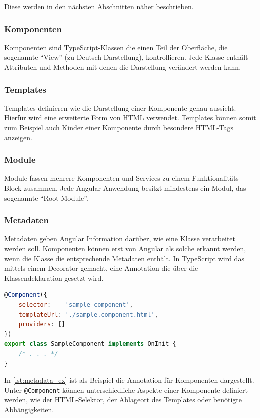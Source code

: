 Diese werden in den nächsten Abschnitten näher beschrieben.

\subsubsection{Komponenten}
Komponenten sind TypeScript-Klassen die einen Teil der Oberfläche, die sogenannte \enquote{View} (zu Deutsch Darstellung), kontrollieren. Jede Klasse enthält Attributen und Methoden mit denen die Darstellung verändert werden kann.

\subsubsection{Templates}
Templates definieren wie die Darstellung einer Komponente genau aussieht. Hierfür wird eine erweiterte Form von \acs{HTML} verwendet. Templates können somit zum Beispiel auch Kinder einer Komponente durch besondere HTML-Tags anzeigen. 

\subsubsection{Module}
Module fassen mehrere Komponenten und Services zu einem Funktionalitäts-Block zusammen. Jede Angular Anwendung besitzt mindestens ein Modul, das sogenannte \enquote{Root Module}.

\subsubsection{Metadaten}
Metadaten geben Angular Information darüber, wie eine Klasse verarbeitet werden soll. Komponenten können erst von Angular als solche erkannt werden, wenn die Klasse die entsprechende Metadaten enthält. In TypeScript wird das mittels einem Decorator gemacht, eine Annotation die über die Klassendeklaration gesetzt wird.
\\
\begin{lstlisting}[language=JavaScript,caption={Beispiel Metadaten-Annotation für Komponenten},label=lst:metadata_ex]
@Component({
	selector:    'sample-component',
	templateUrl: './sample.component.html',
	providers: []
})
export class SampleComponent implements OnInit {
	/* . . . */
}
\end{lstlisting}

In \cref{lst:metadata_ex} ist als Beispiel die Annotation für Komponenten dargestellt. Unter \texttt{@Component} können unterschiedliche Aspekte einer Komponente definiert werden, wie der \acs{HTML}-Selektor, der Ablageort des Templates oder benötigte Abhängigkeiten.

